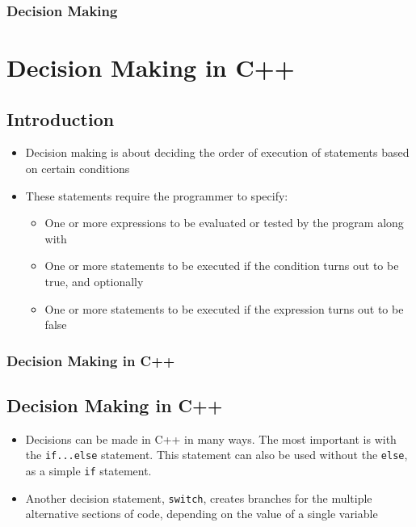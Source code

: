 \documentclass{beamer}
\begin{document}
\begin{frame}
    \frametitle{Decision Making}
    \section{Decision Making in C++} %
    \label{sec:decision_making}
    \subsection{Introduction} %
    \label{sub:introduction}
    \begin{itemize}
        \item Decision making is about deciding the order of execution of statements based on certain conditions
        \item These statements require the programmer to specify:
        \begin{itemize}
            \item One or more expressions to be evaluated or tested by the program along with
            \item One or more statements to be executed if the condition turns out to be true, and optionally
            \item One or more statements to be executed if the expression turns out to be false
        \end{itemize}
    \end{itemize}
\end{frame}

\begin{frame}
    \frametitle{Decision Making in C++}
    \subsection{Decision Making in C++} %
    \label{sub:decision_making_in_c_}
    \begin{itemize}
        \item Decisions can be made in C++ in many ways. The most important is with the \texttt{if...else} statement. This statement can also be used without the \texttt{else}, as a simple \texttt{if} statement.
        \item Another decision statement, \texttt{switch}, creates branches for the multiple alternative sections of code, depending on the value of a single variable
    \end{itemize}
\end{frame}
\end{document}
